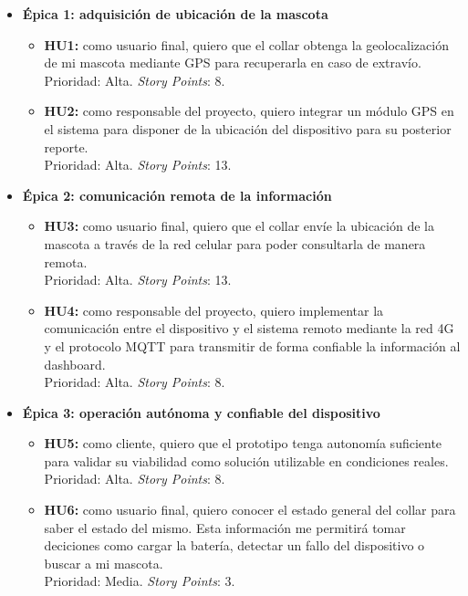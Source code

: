 \documentclass[
11pt, %
]{charter}
\begin{document}
\begin{itemize}
	\item \textbf{Épica 1: adquisición de ubicación de la mascota}
	\begin{itemize}
		\item \textbf{HU1:} como usuario final, quiero que el collar obtenga la geolocalización de mi mascota mediante GPS para recuperarla en caso de extravío.\\
		Prioridad: Alta. \textit{Story Points}: 8.
		\item \textbf{HU2:} como responsable del proyecto, quiero integrar un módulo GPS en el sistema para disponer de la ubicación del dispositivo para su posterior reporte.\\
		Prioridad: Alta. \textit{Story Points}: 13.
	\end{itemize}
	\item \textbf{Épica 2: comunicación remota de la información}
	\begin{itemize}
		\item \textbf{HU3:} como usuario final, quiero que el collar envíe la ubicación de la mascota a través de la red celular para poder consultarla de manera remota.\\
		Prioridad: Alta. \textit{Story Points}: 13.
		\item \textbf{HU4:} como responsable del proyecto, quiero implementar la comunicación entre el dispositivo y el sistema remoto mediante la red 4G y el protocolo MQTT para transmitir de forma confiable la información al dashboard.\\
		Prioridad: Alta. \textit{Story Points}: 8.
	\end{itemize}
	\item \textbf{Épica 3: operación autónoma y confiable del dispositivo}
	\begin{itemize}
		\item \textbf{HU5:} como cliente, quiero que el prototipo tenga autonomía suficiente para validar su viabilidad como solución utilizable en condiciones reales.\\
		Prioridad: Alta. \textit{Story Points}: 8.
		\item \textbf{HU6:} como usuario final, quiero conocer el estado general del collar para saber el estado del mismo. Esta información me permitirá tomar deciciones como cargar la batería, detectar un fallo del dispositivo o buscar a mi mascota.\\
		Prioridad: Media. \textit{Story Points}: 3.
	\end{itemize}

\end{itemize}
\end{document}
